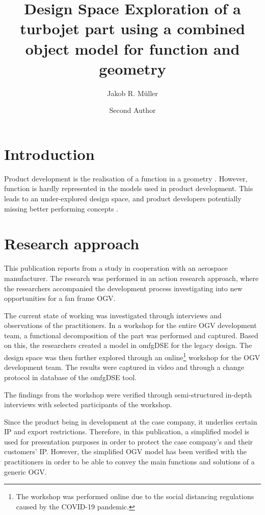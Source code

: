 \documentclass[fleqn,10pt]{olplainarticle}
\title{Design Space Exploration of a turbojet part using a combined object model for function and geometry }
\author[1]{Jakob R. Müller}
\author[2]{Second Author}
\affil[1]{jakob.muller@chalmers.se}
\affil[2]{Address of second author}
\begin{document}
\flushbottom
\maketitle
\thispagestyle{empty}

\section{Introduction}
Product development is the realisation of a function in a geometry \citep{Roozenburg1995}.
However, function is hardly represented in the models used in product development.
This leads to an under-explored design space, and product developers potentially missing better performing concepts \citep{Isaksson2016}.



\section{Research approach}
This publication reports from a study in cooperation with an aerospace manufacturer.
The research was performed in an action research approach, where the researchers accompanied the development process investigating into new opportunities for a fan frame \ac{OGV}.

The current state of working was investigated through interviews and observations of the practitioners.
In a workshop for the entire \ac{OGV} development team, a functional decomposition of the part was performed and captured.
Based on this, the researchers created a model in \ac{omfgDSE} for the legacy design.
The design space was then further explored through an online\footnote{The workshop was performed online due to the social distancing regulations caused by the COVID-19 pandemic.} workshop for the \ac{OGV} development team. 
The results were captured in video and through a change protocol in database of the \ac{omfgDSE} tool.

The findings from the workshop were verified through semi-structured in-depth interviews with selected participants of the workshop.  

Since the product being in development at the case company, it underlies certain \ac{IP} and export restrictions. 
Therefore, in this publication, a simplified model is used for presentation purposes in order to protect the case company's and their customers' \ac{IP}.
However, the simplified \ac{OGV} model has been verified with the practitioners in order to be able to convey the main functions and solutions of a generic \ac{OGV}.
\end{document}
